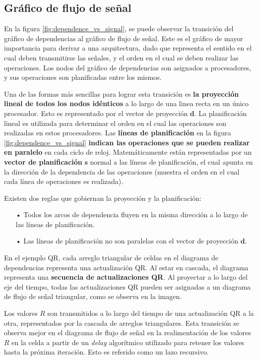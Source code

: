 \subsection{Gráfico de flujo de señal}

En la figura \ref{fig:dependence_vs_signal}, se puede observar la transición del gráfico de dependencias al gráfico de flujo de señal. Este es el gráfico de mayor importancia para derivar a una arquitectura, dado que representa el sentido en el cual deben transmitirse las señales, y el orden en el cual se deben realizar las operaciones. Los nodos del gráfico de dependencias son asignados a procesadores, y sus operaciones son planificadas entre los mismos.

Una de las formas más sencillas para lograr esta transición es \textbf{la proyección lineal de todos los nodos idénticos} a lo largo de una linea recta en un único procesador. Esto es representado por el vector de proyección $\mathbf{d}$. La planificación lineal es utilizada para determinar el orden en el cual las operaciones son realizadas en estos procesadores. Las \textbf{líneas de planificación} en la figura \ref{fig:dependence_vs_signal} \textbf{indican las operaciones que se pueden realizar en paralelo} en cada ciclo de reloj. Matemáticamente están representadas por un \textbf{vector de planificación} $\mathbf{s}$ normal a las líneas de planificación, el cual apunta en la dirección de la dependencia de las operaciones (muestra el orden en el cual cada línea de operaciones es realizada).

Existen dos reglas que gobiernan la proyección y la planificación:

\begin{itemize}
	\item[•] Todos los arcos de dependencia fluyen en la misma dirección a lo largo de las líneas de planificación.
	\item[•] Las líneas de planificación no son paralelas con el vector de proyección $\mathbf{d}$.
\end{itemize}

En el ejemplo QR, cada arreglo triangular de celdas en el diagrama de dependencias representa una actualización QR. Al estar en cascada, el diagrama representa una \textbf{secuencia de actualizaciones QR}. Al proyectar a lo largo del eje del tiempo, todas las actualizaciones QR pueden ser asignadas a un diagrama de flujo de señal triangular, como se observa en la imagen.

Los valores $R$ son transmitidos a lo largo del tiempo de una actualización QR a la otra, representados por la cascada de arreglos triangulares. Esta transición se observa mejor en el diagrama de flujo de señal en la realimentación de los valores $R$ en la celda a partir de un \textit{delay} algorítmico utilizado para retener los valores hasta la próxima iteración. Esto es referido como un lazo recursivo.

